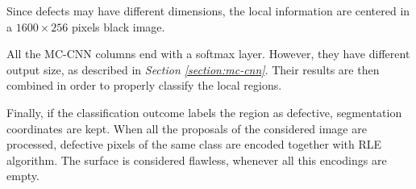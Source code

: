     \par{
        Since defects may have different dimensions, the local information are centered in a $1600\times 256$ pixels black image.
    }
    \par{
        All the MC-CNN columns end with a softmax layer. However, they have different output size, as described in \emph{Section \ref{section:mc-cnn}}. Their results are then combined in order to properly classify the local regions.
    }
    \par{
        Finally, if the classification outcome labels the region as defective, segmentation coordinates are kept. When all the proposals of the considered image are processed, defective pixels of the same class are encoded together with RLE algorithm. The surface is considered flawless, whenever all this encodings are empty.
    }